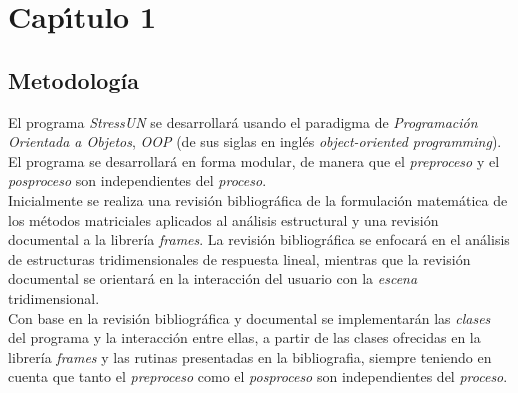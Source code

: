 \chapter{Cap\'{\i}tulo 1}


\section{Metodología}
 El programa \textit{StressUN} se desarrollará usando el paradigma de \textit{Programación Orientada a Objetos}, \textit{OOP} (de sus siglas en inglés \textit{object-oriented programming}). El programa se desarrollará en forma modular, de manera que el \textit{preproceso} y el \textit{posproceso} son independientes del \textit{proceso}.\\

Inicialmente se realiza una revisión bibliográfica de la formulación matemática de los métodos matriciales aplicados al análisis estructural y una revisión documental a la librería \textit{frames}.
La revisión bibliográfica se enfocará en el análisis de estructuras tridimensionales de respuesta lineal, mientras que la revisión documental se orientará en la interacción del usuario con la \textit{escena} tridimensional.\\

Con base en la revisión bibliográfica y documental se implementarán las \textit{clases} del programa y la interacción entre ellas, a partir de las clases ofrecidas en la librería \textit{frames} y las rutinas presentadas en la bibliografia, siempre teniendo en cuenta que tanto el \textit{preproceso} como el \textit{posproceso} son independientes del \textit{proceso}.\\

